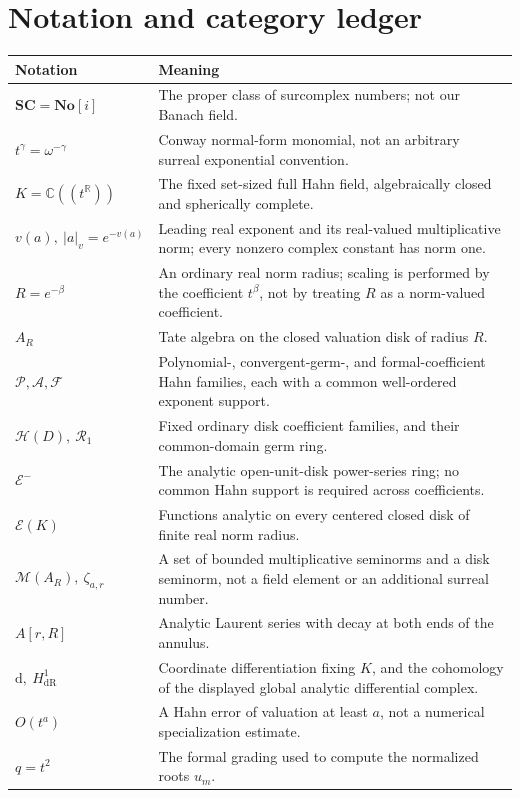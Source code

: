 \documentclass[11pt,a4paper]{article}
\numberwithin{equation}{section}
\theoremstyle{definition}
\theoremstyle{remark}
\newcommand{\No}{\mathbf{No}}
\newcommand{\SC}{\mathbf{SC}}
\newcommand{\C}{\mathbb C}
\newcommand{\R}{\mathbb R}
\newcommand{\PP}{\mathcal P}
\newcommand{\Ag}{\mathcal A}
\newcommand{\FF}{\mathcal F}
\newcommand{\EE}{\mathcal E}
\newcommand{\vabs}[1]{\lvert#1\rvert_v}
\newcommand{\dR}{\mathrm{dR}}
\newcommand{\Sp}{\mathcal M}
\begin{document}
\section{Notation and category ledger}
\label{app:notation}
\begin{longtable}{@{}P{0.29\textwidth}P{0.66\textwidth}@{}}
\toprule
Notation & Meaning\\\midrule\endhead
$\SC=\No[i]$ & The proper class of surcomplex numbers; not our Banach field.\\[0.45em]
$t^\gamma=\omega^{-\gamma}$ & Conway normal-form monomial, not an arbitrary
surreal exponential convention.\\[0.45em]
$K=\C((t^\R))$ & The fixed set-sized full Hahn field, algebraically closed and
spherically complete.\\[0.45em]
$v(a),\ \vabs a=e^{-v(a)}$ & Leading real exponent and its real-valued
multiplicative norm; every nonzero complex constant has norm one.\\[0.45em]
$R=e^{-\beta}$ & An ordinary real norm radius; scaling is performed by the
coefficient $t^\beta$, not by treating $R$ as a norm-valued coefficient.\\[0.45em]
$A_R$ & Tate algebra on the closed valuation disk of radius $R$.\\[0.45em]
$\PP,\Ag,\FF$ & Polynomial-, convergent-germ-, and formal-coefficient Hahn
families, each with a common well-ordered exponent support.\\[0.45em]
$\mathcal H(D),\ \mathcal R_1$ & Fixed ordinary disk coefficient families,
and their common-domain germ ring.\\[0.45em]
$\EE^-$ & The analytic open-unit-disk power-series ring; no common Hahn support
is required across coefficients.\\[0.45em]
$\EE(K)$ & Functions analytic on every centered closed disk of finite real norm
radius.\\[0.45em]
$\Sp(A_R),\ \zeta_{a,r}$ & A set of bounded multiplicative seminorms and a disk
seminorm, not a field element or an additional surreal number.\\[0.45em]
$A[r,R]$ & Analytic Laurent series with decay at both ends of the annulus.\\[0.45em]
$\mathrm d,\ H^1_{\dR}$ & Coordinate differentiation fixing $K$, and the
cohomology of the displayed global analytic differential complex.\\[0.45em]
$O(t^a)$ & A Hahn error of valuation at least $a$, not a numerical
specialization estimate.\\[0.45em]
$q=t^2$ & The formal grading used to compute the normalized roots $u_m$.
\\\bottomrule
\end{longtable}
\end{document}
